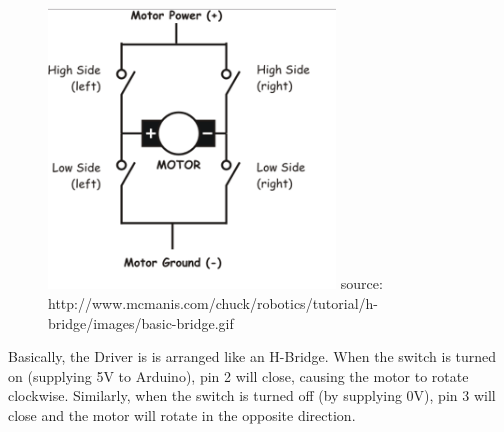 \documentclass[final,3p,times,twocolumn]{elsarticle}
\begin{document}
\begin{figure}[h!]
\includegraphics[trim={0cm 0.5cm 0cm 0.1cm}, clip, width=3in]{./media/hBridge.jpg}
source: http://www.mcmanis.com/chuck/robotics/tutorial/h-bridge/images/basic-bridge.gif
\end{figure}
Basically, the Driver is is arranged like an H-Bridge. When the switch is turned on (supplying 5V to Arduino), pin 2 will close, causing the motor to rotate clockwise. Similarly, when the switch is turned off (by supplying 0V), pin 3 will close and the motor will rotate in the opposite direction.
\end{document}

